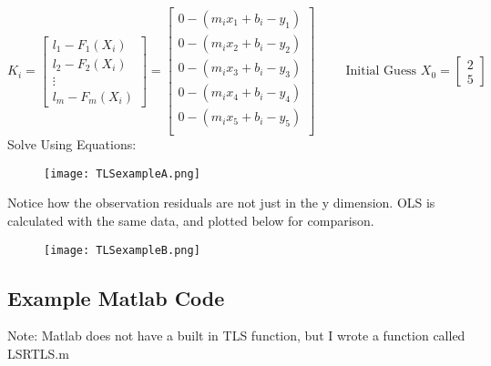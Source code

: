 \[
K_i = 
\begin{bmatrix}
l_1 - F_1(X_i) \\ l_2 - F_2(X_i)\\ \vdots \\ l_m - F_m(X_i)
\end{bmatrix}
= 
\begin{bmatrix}
0 - (m_ix_1+b_i-y_1)\\ 
0 - (m_ix_2+b_i-y_2)\\
0 - (m_ix_3+b_i-y_3)\\ 
0 - (m_ix_4+b_i-y_4)\\
0 - (m_ix_5+b_i-y_5)\\
\end{bmatrix}
\hspace{1cm}
\text{Initial Guess } X_0 = 
\begin{bmatrix}
2 \\ 5
\end{bmatrix}
\]
Solve Using Equations:

\begin{figure}[H]
	\centering
	\texttt{[image: TLSexampleA.png]}
\end{figure}


Notice how the observation residuals are not just in the y dimension.  OLS is calculated with the same data, and plotted below for comparison.

\begin{figure}[H]
	\centering
	\texttt{[image: TLSexampleB.png]}
\end{figure}
\clearpage
\subsection{Example Matlab Code}


Note: Matlab does not have a built in TLS function, but I wrote a function called LSRTLS.m

